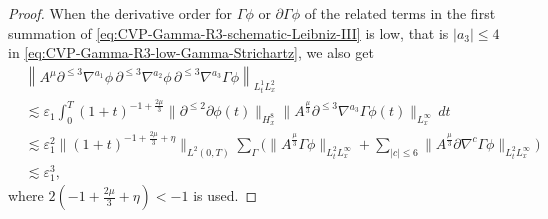 \documentclass[11pt,twoside]{article}
\def\p{\partial}
\def\ve{\varepsilon}
\def\ls{\lesssim}
\theoremstyle{plain}
\theoremstyle{definition}
\theoremstyle{assumption}
\numberwithin{equation}{section}
\begin{document}
\begin{proof}
When the derivative order for \(\Gamma\phi\) or \(\p\Gamma\phi\) of the related terms in the first summation
of \eqref{eq:CVP-Gamma-R3-schematic-Leibniz-III} is low, that is $|a_3|\le 4$ in \eqref{eq:CVP-Gamma-R3-low-Gamma-Strichartz},
we also get
		\begin{equation}
			\label{eq:CVP-Gamma-R3-low-Gamma-Strichartz}
			\begin{aligned}
				&
				\left\|
				A^{\mu}
				\p^{\le3}\nabla^{a_1}\phi\,
				\p^{\le3}\nabla^{a_2}\phi\,
				\p^{\le3}\nabla^{a_3}\Gamma\phi
				\right\|_{L^1_tL^2_x}
				\\
				&\ls
				\ve_1
				\int_0^T
				(1+t)^{-1+\frac{2\mu}{3}}
				\|\p^{\le2}\p\phi(t)\|_{H^{8}_x}
				\big\|
				A^{\frac{\mu}{3}}
				\p^{\le3}\nabla^{a_3}\Gamma\phi(t)
				\big\|_{L^\infty_x}
				\,dt
				\\
				&\ls
				\ve_1^2
				\big\|
				(1+t)^{-1+\frac{2\mu}{3}+\eta}
				\big\|_{L^2(0,T)}
				\sum_{\Gamma}
				\big(
				\big\|
				A^{\frac{\mu}{3}}\Gamma\phi
				\big\|_{L^2_tL^\infty_x}
				+\sum_{|c|\le 6}
				\big\|
				A^{\frac{\mu}{3}}
				\p\nabla^c\Gamma\phi
				\big\|_{L^2_tL^\infty_x}
				\big)
				\\
				&\ls
				\ve_1^3,
			\end{aligned}
		\end{equation}
		where $2(-1+\frac{2\mu}{3}+\eta)<-1$ is used.
		

\end{proof}
\end{document}
